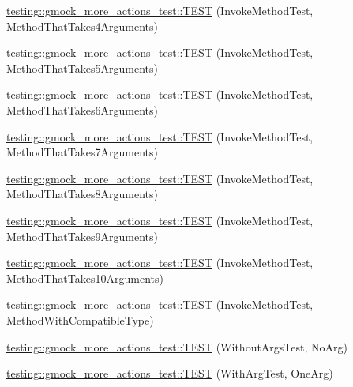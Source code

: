\begin{DoxyCompactItemize}
\item 
\hyperlink{namespacetesting_1_1gmock__more__actions__test_af0ab6ef9fdf48e8442a5579ab27eb517}{testing\+::gmock\+\_\+more\+\_\+actions\+\_\+test\+::\+T\+E\+ST} (Invoke\+Method\+Test, Method\+That\+Takes4\+Arguments)
\item 
\hyperlink{namespacetesting_1_1gmock__more__actions__test_a512db122c5beadeeef026bb54aec7e45}{testing\+::gmock\+\_\+more\+\_\+actions\+\_\+test\+::\+T\+E\+ST} (Invoke\+Method\+Test, Method\+That\+Takes5\+Arguments)
\item 
\hyperlink{namespacetesting_1_1gmock__more__actions__test_a715c088109e141aa577e497e3729b98b}{testing\+::gmock\+\_\+more\+\_\+actions\+\_\+test\+::\+T\+E\+ST} (Invoke\+Method\+Test, Method\+That\+Takes6\+Arguments)
\item 
\hyperlink{namespacetesting_1_1gmock__more__actions__test_a1f11171c55d049143c980502213e0b11}{testing\+::gmock\+\_\+more\+\_\+actions\+\_\+test\+::\+T\+E\+ST} (Invoke\+Method\+Test, Method\+That\+Takes7\+Arguments)
\item 
\hyperlink{namespacetesting_1_1gmock__more__actions__test_a5bfedd2255bbfe7ffcbc76ec581b2ff6}{testing\+::gmock\+\_\+more\+\_\+actions\+\_\+test\+::\+T\+E\+ST} (Invoke\+Method\+Test, Method\+That\+Takes8\+Arguments)
\item 
\hyperlink{namespacetesting_1_1gmock__more__actions__test_acdcc7f6a35e6373f3d0b3a71f98c418b}{testing\+::gmock\+\_\+more\+\_\+actions\+\_\+test\+::\+T\+E\+ST} (Invoke\+Method\+Test, Method\+That\+Takes9\+Arguments)
\item 
\hyperlink{namespacetesting_1_1gmock__more__actions__test_a14b55eb4c0d0b3149e269eea1443cb58}{testing\+::gmock\+\_\+more\+\_\+actions\+\_\+test\+::\+T\+E\+ST} (Invoke\+Method\+Test, Method\+That\+Takes10\+Arguments)
\item 
\hyperlink{namespacetesting_1_1gmock__more__actions__test_adb0c29d688c079ad5bf07d5a0bd72aea}{testing\+::gmock\+\_\+more\+\_\+actions\+\_\+test\+::\+T\+E\+ST} (Invoke\+Method\+Test, Method\+With\+Compatible\+Type)
\item 
\hyperlink{namespacetesting_1_1gmock__more__actions__test_a68748f21021e787dfdc095691c94d495}{testing\+::gmock\+\_\+more\+\_\+actions\+\_\+test\+::\+T\+E\+ST} (Without\+Args\+Test, No\+Arg)
\item 
\hyperlink{namespacetesting_1_1gmock__more__actions__test_a40664c1acdc3650e8edf9a9a49b008de}{testing\+::gmock\+\_\+more\+\_\+actions\+\_\+test\+::\+T\+E\+ST} (With\+Arg\+Test, One\+Arg)
\item 

\end{DoxyCompactItemize}
